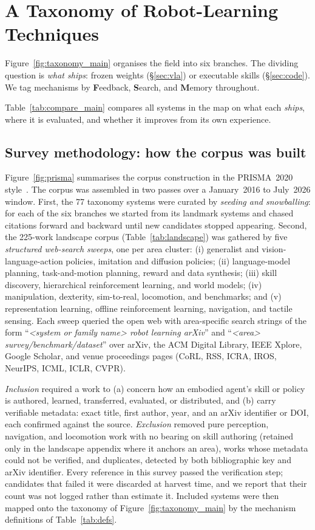 \section{A Taxonomy of Robot-Learning Techniques}
\label{sec:taxonomy}

Figure~\ref{fig:taxonomy_main} organises the field into six branches. The dividing
question is \emph{what ships}: frozen weights (\S\ref{sec:vla}) or executable skills
(\S\ref{sec:code}). We tag mechanisms by \textbf{F}eedback, \textbf{S}earch, and
\textbf{M}emory throughout.

Table~\ref{tab:compare_main} compares all systems in the map on what each \emph{ships}, where
it is evaluated, and whether it improves from its own experience.


\subsection{Survey methodology: how the corpus was built}
\label{sec:method}

Figure~\ref{fig:prisma} summarises the corpus construction in the PRISMA~2020
style~\citep{prisma2020}. The corpus was assembled in two passes over a January~2016 to
July~2026 window. First, the 77 taxonomy systems were curated by \emph{seeding and
snowballing}: for each of the six branches we started from its landmark systems and chased
citations forward and backward until new candidates stopped appearing. Second, the 225-work
landscape corpus (Table~\ref{tab:landscape}) was gathered by five \emph{structured web-search
sweeps}, one per area cluster: (i) generalist and vision-language-action policies, imitation
and diffusion policies; (ii) language-model planning, task-and-motion planning, reward and data
synthesis; (iii) skill discovery, hierarchical reinforcement learning, and world models;
(iv) manipulation, dexterity, sim-to-real, locomotion, and benchmarks; and (v) representation
learning, offline reinforcement learning, navigation, and tactile sensing. Each sweep queried
the open web with area-specific search strings of the form ``\emph{<system or family name>
robot learning arXiv}'' and ``\emph{<area> survey/benchmark/dataset}'' over arXiv, the ACM
Digital Library, IEEE Xplore, Google Scholar, and venue proceedings pages (CoRL, RSS, ICRA,
IROS, NeurIPS, ICML, ICLR, CVPR).

\emph{Inclusion} required a work to (a) concern how an embodied agent's skill or policy is
authored, learned, transferred, evaluated, or distributed, and (b) carry verifiable metadata:
exact title, first author, year, and an arXiv identifier or DOI, each confirmed against the
source. \emph{Exclusion} removed pure perception, navigation, and locomotion work with no
bearing on skill authoring (retained only in the landscape appendix where it anchors an area),
works whose metadata could not be verified, and duplicates, detected by both bibliographic key
and arXiv identifier. Every reference in this survey passed the verification step; candidates
that failed it were discarded at harvest time, and we report that their count was not logged
rather than estimate it. Included systems were then mapped onto the taxonomy of
Figure~\ref{fig:taxonomy_main} by the mechanism definitions of Table~\ref{tab:defs}.

